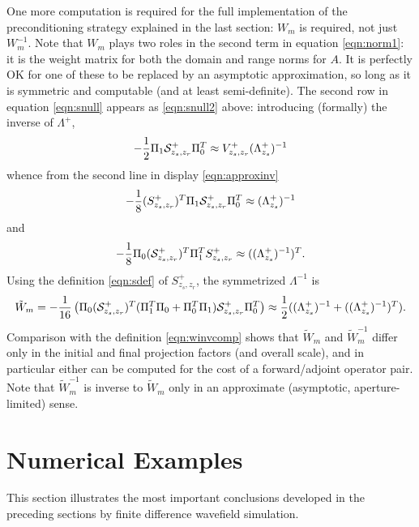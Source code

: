 \documentclass[georeport,12pt]{geophysics}
\begin{document}
One more computation is required for the full implementation of the
preconditioning strategy explained in the last section: $W_m$ is
required, not just $W_m^{-1}$. Note that $W_m$ plays two roles in the
second term in equation \ref{eqn:norm1}: it is the weight matrix for
both the domain and range norms for $A$. It is perfectly OK for one of
these to be replaced by an asymptotic approximation, so long as it is
symmetric and computable (and at least semi-definite). The second row
in equation \ref{eqn:snull} appears as \ref{eqn:snull2} above:
introducing (formally) the inverse of $\Lambda^+$,
\begin{equation}
  \label{eqn:snull2mod}
-\frac{1}{2}\Pi_1{\cal S}^{+}_{z_s,z_r}\Pi_0^T  \approx
V^{+}_{z_s,z_r}(\Lambda^{+}_{z_s})^{-1}
\end{equation}
whence from the second line in display \ref{eqn:approxinv}
\begin{equation}
  \label{eqn:laminv}
-\frac{1}{8}(S^+_{z_s,z_r})^T\Pi_1{\cal S}^{+}_{z_s,z_r}\Pi_0^T  
\approx (\Lambda^{+}_{z_s})^{-1}
\end{equation} 
and
\begin{equation}
  \label{eqn:laminvtr}
-\frac{1}{8}\Pi_0({\cal S}^{+}_{z_s,z_r})^T\Pi_1^T S^+_{z_s,z_r}
\approx ((\Lambda^{+}_{z_s})^{-1})^T.
\end{equation}
Using the definition \ref{eqn:sdef} of $S^+_{z_s,z_r}$, the
symmetrized $\Lambda^{-1}$ is
\begin{equation}
  \label{wcomp}
 \tilde{W}_m = -\frac{1}{16}\left(\Pi_0 ({\cal S}^{+}_{z_s,z_r})^T
   (\Pi_1^T \Pi_0 + \Pi_0^T \Pi_1) {\cal S}^{+}_{z_s,z_r} \Pi_0^T\right)
   \approx \frac{1}{2}((\Lambda^{+}_{z_s})^{-1}
   +((\Lambda^{+}_{z_s})^{-1})^T) .
\end{equation}
Comparison with the definition \ref{eqn:winvcomp} shows that
$\tilde{W}_m$ and $\tilde{W}_m^{-1}$ differ only in the initial and
final projection factors (and overall scale), and in particular either
can be computed for the cost of a forward/adjoint operator pair. Note
that $\tilde{W}_m^{-1}$ is inverse to $\tilde{W}_m$ only in an
approximate (asymptotic, aperture-limited) sense.

\section{Numerical Examples}
This section illustrates the most important conclusions developed in
the preceding sections by finite difference wavefield simulation.
\end{document}
